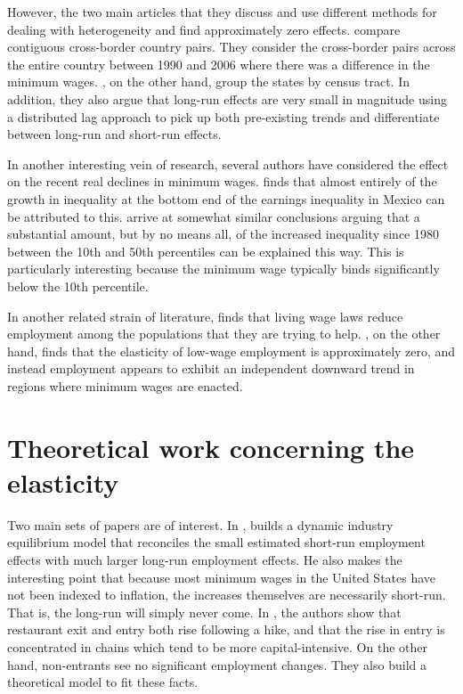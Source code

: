 \documentclass[11pt]{amsart}
\begin{document}
However, the two main articles that they discuss \cite{allegretto2011minimum} and \cite{dube2010minimum} use different methods for dealing with heterogeneity and find approximately zero effects. 
\cite{dube2010minimum} compare contiguous cross-border country pairs. 
They consider the cross-border pairs across the entire country between 1990 and 2006 where there was a difference in the minimum wages. 
\cite{allegretto2011minimum}, on the other hand, group the states by census tract.
In addition, they also argue that long-run effects are very small in magnitude using a distributed lag approach to pick up both pre-existing trends and differentiate between long-run and short-run effects. 

In another interesting vein of research, several authors have considered the effect on the recent real declines in minimum wages.
\cite{bosch2010minimum} finds that almost entirely of the growth in inequality at the bottom end of the earnings inequality in Mexico can be attributed to this.
\cite{autor2016contribution} arrive at somewhat similar conclusions arguing that a substantial amount, but by no means all, of the increased inequality since 1980 between the 10th and 50th percentiles can be explained this way.
This is particularly interesting because the minimum wage typically binds significantly below the 10th percentile.

In another related strain of literature, \cite{neumark2012effects} finds that living wage laws reduce employment among the populations that they are trying to help.
\cite{addison2012effect}, on the other hand, finds that the elasticity of low-wage employment is approximately zero, and instead employment appears to exhibit an independent downward trend in regions where minimum wages are enacted. 


\section*{Theoretical work concerning the elasticity}

Two main sets of papers are of interest. 
In \cite{sorkin2015are}, \citeauthor{sorkin2015are} builds a dynamic industry equilibrium model that reconciles the small estimated short-run employment effects with much larger long-run employment effects. 
He also makes the interesting point that because most minimum wages in the United States have not been indexed to inflation, the increases themselves are necessarily short-run. 
That is, the long-run will simply never come.  
In \cite{aaronson2016industry}, the authors show that restaurant exit and entry both rise following a hike, and that the rise in entry is concentrated in chains which tend to be more capital-intensive. 
On the other hand, non-entrants see no significant employment changes. 
They also build a theoretical model to fit these facts.
\end{document}
